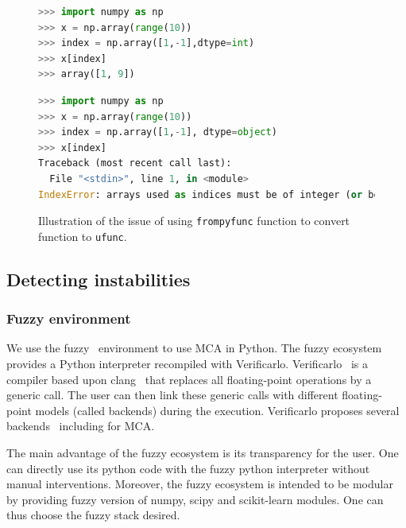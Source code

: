 \documentclass[11pt]{article}
\begin{document}
\begin{figure}
\begin{minipage}[t]{0.4\linewidth}
    \begin{lstlisting}[language=Python,style=customPython]
>>> import numpy as np
>>> x = np.array(range(10))
>>> index = np.array([1,-1],dtype=int)
>>> x[index]
>>> array([1, 9])
    \end{lstlisting}
    \label{fig:wrapper_code}
\end{minipage}
\begin{minipage}[t]{0.4\linewidth}
    \begin{lstlisting}[language=Python,style=customPython]
>>> import numpy as np
>>> x = np.array(range(10))
>>> index = np.array([1,-1], dtype=object)
>>> x[index]
Traceback (most recent call last):
  File "<stdin>", line 1, in <module>
IndexError: arrays used as indices must be of integer (or boolean) type
    \end{lstlisting}
    \label{fig:wrapper_code}
\end{minipage}
\caption{Illustration of the issue of using \texttt{frompyfunc} function to convert function to \texttt{ufunc}.}
\end{figure}

\subsection{Detecting instabilities}

\subsubsection{Fuzzy environment}

We use the fuzzy~\cite{kiar2020comparing} environment to use MCA in Python.
The fuzzy ecosystem provides a Python interpreter recompiled with Verificarlo.
Verificarlo~\cite{verificarlo} is a compiler based upon clang~\cite{lattner2008llvm}
that replaces all floating-point operations by a generic call. 
The user can then link these generic calls with different floating-point models 
(called backends) during the execution. Verificarlo proposes several 
backends~\cite{chatelain2019automatic,chatelain2019outils} including for MCA.

The main advantage of the fuzzy ecosystem is its transparency for the user.
One can directly use its python code with the fuzzy python interpreter
without manual interventions. Moreover, the fuzzy ecosystem is intended to be
modular by providing fuzzy version of numpy, scipy and scikit-learn modules.
One can thus choose the fuzzy stack desired.
\end{document}
